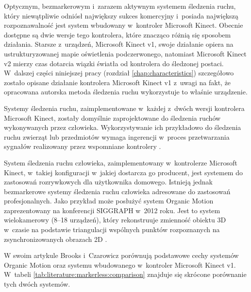 Optycznym, bezmarkerowym i~zarazem aktywnym systemem śledzenia ruchu, który niewątpliwie odniósł największy sukces komercyjny i~posiada największą rozpoznawalność jest system wbudowany w~kontroler Microsoft Kinect. Obecnie dostępne są dwie wersje tego kontrolera, które znacząco różnią się sposobem działania. Starsze z~urządzeń, Microsoft Kinect v1, swoje działanie opiera na ustrukturyzowanej mapie oświetlenia podczerwonego, natomiast Microsoft Kinect v2 mierzy czas dotarcia wiązki światła od kontrolera do śledzonej postaci. W~dalszej części niniejszej pracy (rozdział \ref{chap:characteristics}) szczegółowo zostało opisane działanie kontrolera Microsoft Kinect v1 z~uwagi na fakt, że opracowana autorska metoda śledzenia ruchu wykorzystuje to właśnie urządzenie. 

Systemy śledzenia ruchu, zaimplementowane w~każdej z~dwóch wersji kontrolera Microsoft Kinect, zostały domyślnie zaprojektowane do śledzenia ruchów wykonywanych przez człowieka. Wykorzystywanie ich przykładowo do śledzenia ruchu zwierząt lub przedmiotów wymaga ingerencji w~proces przetwarzania sygnałów realizowany przez wspomniane kontrolery \cite{Nirjon2012}.

System śledzenia ruchu człowieka, zaimplementowany w~kontrolerze Microsoft Kinect, w~takiej konfiguracji w~jakiej dostarcza go producent, jest systemem do zastosowań rozrywkowych dla użytkownika domowego. Istnieją jednak bezmarkerowe systemy śledzenia ruchu człowieka adresowane do zastosowań profesjonalnych. Jako przykład może posłużyć system Organic Motion zaprezentowany na konferencji SIGGRAPH w~2012 roku. Jest to system wielokamerowy (8--18 urządzeń), który rekonstruuje zmienność obiektu 3D w~czasie na podstawie triangulacji wspólnych punktów rozpoznanych na zsynchronizowanych obrazach 2D \cite{Brooks2012}.

W swoim artykule Brooks i~Czarowicz \cite{Brooks2012} porównują podstawowe cechy systemów Organic Motion oraz systemu wbudowanego w~kontroler Microsoft Kinect v1. W~tabeli \ref{tab:literature:markerless:comparison} znajduje się skrócone porównanie tych dwóch systemów. 

